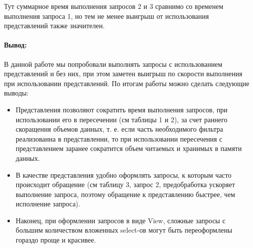 \documentclass[a4paper,12pt]{article}
\begin{document}
Тут суммарное время выполнения запросов 2 и 3 сравнимо со временем выполнения запроса 1, но тем не менее выигрыш от использования представлений также значителен.

\paragraph{Вывод:} В данной работе мы попробовали выполнять запросы с использованием представлений и без них, при этом заметен выигрыш
по скорости выполнения при использовании представлений. По итогам работы можно сделать следующие выводы:

\begin{itemize}
\item Представления позволяют сократить время выполнения запросов, при использовании его в пересечении (см таблицы 1 и 2),
за счет раннего скоращения объемов данных, т. е. если часть необходимого фильтра реализованна в представлении, то при использовании
пересечения с представлением заранее сократится объем читаемых и хранимых в памяти данных.

\item В качестве представления удобно оформлять запросы, к которым часто происходит обращение (см таблицу 3, запрос 2, предобработка
ускоряет выполнение запроса, поэтому обращение к представлению быстрее, чем исполнение запроса).

\item Наконец, при оформлении запросов в виде View, сложные запросы с большим количеством вложенных select-ов могут быть переоформлены гораздо проще и красивее.
\end{itemize}
\end{document}
